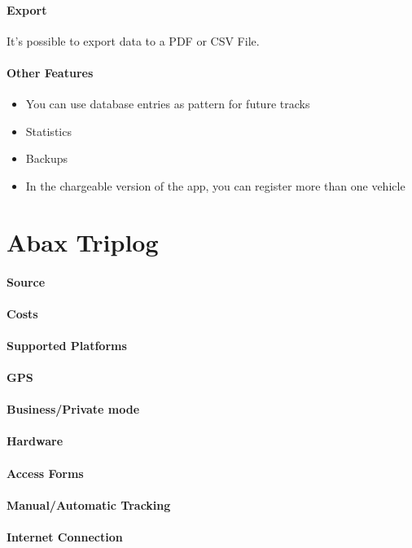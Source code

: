 \paragraph{Export} It’s possible to export data to a PDF or CSV File.
\paragraph{Other Features} 
\begin{itemize}
\item You can use database entries as pattern for future tracks
\item Statistics
\item Backups
\item In the chargeable version of the app, you can register more than one vehicle
\end{itemize}
\newpage
\section{Abax Triplog}
\paragraph{Source} 
\paragraph{Costs} 
\paragraph{Supported Platforms} 
\paragraph{GPS} 
\paragraph{Business/Private mode}
\paragraph{Hardware}
\paragraph{Access Forms}
\paragraph{Manual/Automatic Tracking}
\paragraph{Internet Connection}
